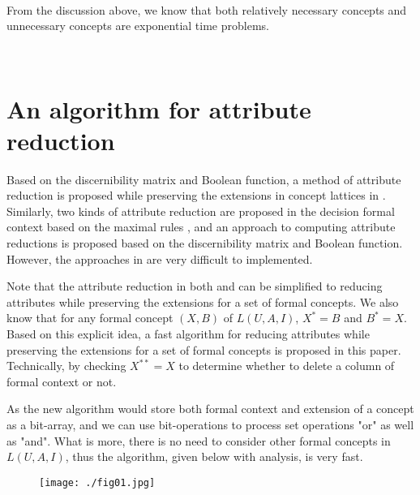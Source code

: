 \documentclass[11pt]{article}
\numberwithin{equation}{subsection}
\begin{document}
\

From the discussion above, we know that both relatively necessary concepts and unnecessary concepts are exponential time problems.


\
%



\section{An algorithm for attribute reduction\label{s03}}


Based on the discernibility matrix and
Boolean function, a method of attribute reduction is proposed while preserving the extensions
in concept lattices in \cite{Zhang, Zhang05}.  Similarly,
 two kinds of attribute reduction are proposed in the decision formal context based on the maximal rules \cite{Li}, and an approach to computing attribute reductions is proposed based on the discernibility matrix and Boolean function. However, the approaches in \cite{Zhang, Zhang05,Li} are very difficult to implemented.

Note that the attribute reduction in both \cite{Zhang, Zhang05} and \cite{Li}  can be simplified to  reducing attributes while preserving the extensions for a set of formal concepts. We also know that  for any formal concept $(X,B)$ of $L(U, A, I)$,   $X^*=B$ and $B^*=X$.
Based on this explicit idea, a fast algorithm for  reducing attributes while preserving the extensions for a set of  formal concepts is proposed in this paper.
Technically, by checking   $X^{**}=X$ to determine whether to delete a column of formal context or not.

As the new algorithm would store both formal context and extension of a concept as a  bit-array, and we can use bit-operations to process set operations "or" as well as "and". What is more, there is no need to consider other formal concepts in $L(U, A, I)$, thus the algorithm, given below with analysis, is very fast.



    \begin{figure}[htp] \centering
        \texttt{[image: ./fig01.jpg]}
        \label{figInClose2}
    \end{figure}
\end{document}
